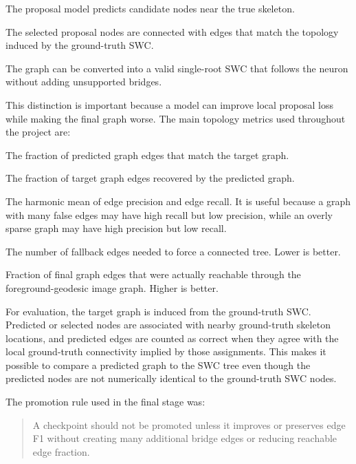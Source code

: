 \documentclass[11pt]{article}
\begin{document}
\begin{description}[leftmargin=3.6cm]
  \item[Proposal success] The proposal model predicts candidate nodes near the
  true skeleton.
  \item[Graph success] The selected proposal nodes are connected with edges that
  match the topology induced by the ground-truth SWC.
  \item[Reconstruction success] The graph can be converted into a valid
  single-root SWC that follows the neuron without adding unsupported bridges.
\end{description}

This distinction is important because a model can improve local proposal loss
while making the final graph worse. The main topology metrics used throughout
the project are:

\begin{description}[leftmargin=3.6cm]
  \item[Edge precision] The fraction of predicted graph edges that match the
  target graph.
  \item[Edge recall] The fraction of target graph edges recovered by the
  predicted graph.
  \item[Edge F1] The harmonic mean of edge precision and edge recall. It is
  useful because a graph with many false edges may have high recall but low
  precision, while an overly sparse graph may have high precision but low
  recall.
  \item[Bridge edges] The number of fallback edges needed to force a connected
  tree. Lower is better.
  \item[Reachable edge fraction] Fraction of final graph edges that were
  actually reachable through the foreground-geodesic image graph. Higher is
  better.
\end{description}

For evaluation, the target graph is induced from the ground-truth SWC. Predicted
or selected nodes are associated with nearby ground-truth skeleton locations,
and predicted edges are counted as correct when they agree with the local
ground-truth connectivity implied by those assignments. This makes it possible
to compare a predicted graph to the SWC tree even though the predicted nodes are
not numerically identical to the ground-truth SWC nodes.

The promotion rule used in the final stage was:

\begin{quote}
A checkpoint should not be promoted unless it improves or preserves edge F1
without creating many additional bridge edges or reducing reachable edge
fraction.
\end{quote}
\end{document}
